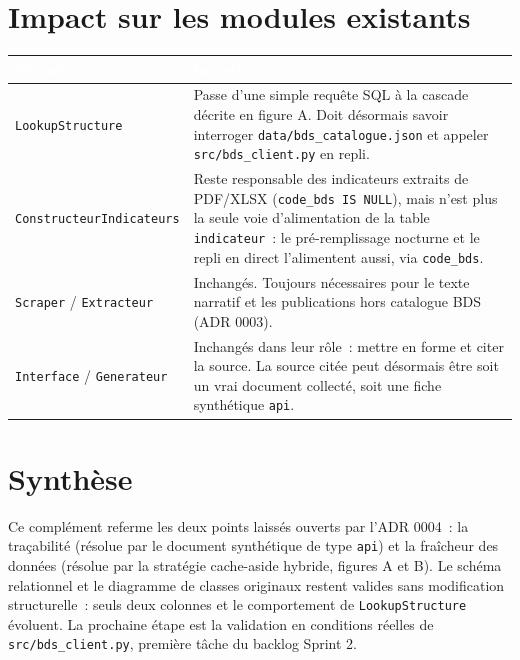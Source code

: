 \documentclass[11pt,a4paper]{article}
\newcommand{\tblhead}[1]{\textcolor{white}{\textbf{#1}}}
\begin{document}
\section{Impact sur les modules existants}
\begin{longtable}{@{}p{3.9cm}p{12.5cm}@{}}
\rowcolor{navy}
\tblhead{Module} & \tblhead{Impact} \\
\midrule
\endhead
\texttt{LookupStructure} & Passe d'une simple requ\^ete SQL \`a la cascade d\'ecrite en figure A. Doit d\'esormais savoir interroger \texttt{data/bds\_catalogue.json} et appeler \texttt{src/bds\_client.py} en repli. \\
\texttt{ConstructeurIndicateurs} & Reste responsable des indicateurs extraits de PDF/XLSX (\texttt{code\_bds IS NULL}), mais n'est plus la seule voie d'alimentation de la table \texttt{indicateur}~: le pr\'e-remplissage nocturne et le repli en direct l'alimentent aussi, via \texttt{code\_bds}. \\
\texttt{Scraper} / \texttt{Extracteur} & Inchang\'es. Toujours n\'ecessaires pour le texte narratif et les publications hors catalogue BDS (ADR 0003). \\
\texttt{Interface} / \texttt{Generateur} & Inchang\'es dans leur r\^ole~: mettre en forme et citer la source. La source cit\'ee peut d\'esormais \^etre soit un vrai document collect\'e, soit une fiche synth\'etique \texttt{api}. \\
\end{longtable}

\section{Synth\`ese}
Ce compl\'ement referme les deux points laiss\'es ouverts par l'ADR 0004~: la tra\c{c}abilit\'e (r\'esolue par le document synth\'etique de type \texttt{api}) et la fra\^icheur des donn\'ees (r\'esolue par la strat\'egie cache-aside hybride, figures A et B). Le sch\'ema relationnel et le diagramme de classes originaux restent valides sans modification structurelle~: seuls deux colonnes et le comportement de \texttt{LookupStructure} \'evoluent. La prochaine \'etape est la validation en conditions r\'eelles de \texttt{src/bds\_client.py}, premi\`ere t\^ache du backlog Sprint 2.
\end{document}

